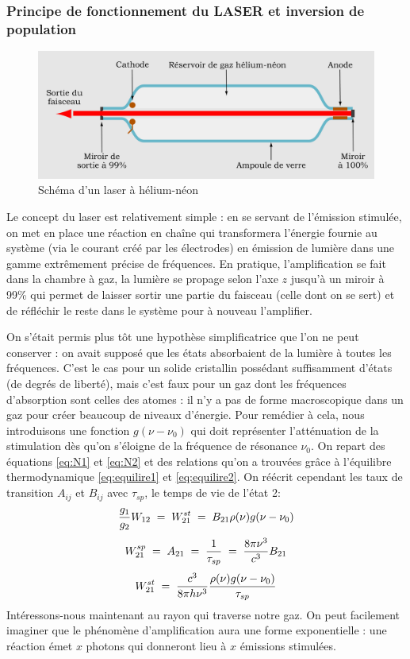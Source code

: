\subsubsection{Principe de fonctionnement du LASER et inversion de population}



\begin{figure}[htp]
    \centering
    \includegraphics[scale=0.7]{Images2/Laser.png}
    \caption{Schéma d'un laser à hélium-néon}
    \label{fig:Laser}
\end{figure}
Le concept du laser est relativement simple : en se servant de l'émission stimulée, on met en place une réaction en chaîne qui transformera l'énergie fournie au système (via le courant créé par les électrodes) en émission de lumière dans une gamme extrêmement précise de fréquences. En pratique, l'amplification se fait dans la chambre à gaz, la lumière se propage selon l'axe $z$ jusqu'à un miroir à 99\% qui permet de laisser sortir une partie du faisceau (celle dont on se sert) et de réfléchir le reste dans le système pour à nouveau l'amplifier.

On s'était permis plus tôt une hypothèse simplificatrice que l'on ne peut conserver : on avait supposé que les états absorbaient de la lumière à toutes les fréquences. C'est le cas pour un solide cristallin possédant suffisamment d'états (de degrés de liberté), mais c'est faux pour un gaz dont les fréquences d'absorption sont celles des atomes : il n'y a pas de forme macroscopique dans un gaz pour créer beaucoup de niveaux d'énergie. Pour remédier à cela, nous introduisons une fonction $g(\nu - \nu_0)$ qui doit représenter l'atténuation de la stimulation dès qu'on s'éloigne de la fréquence de résonance $\nu_0$. On repart des équations \ref{eq:N1} et \ref{eq:N2} et des relations qu'on a trouvées grâce à l'équilibre thermodynamique \ref{eq:equilire1} et \ref{eq:equilire2}. On réécrit cependant les taux de transition $A_{ij}$ et $B_{ij}$ avec $\tau_{sp}$, le temps de vie de l'état 2:
\[
    \dfrac{g_1}{g_2}W_{12} \; = \; W_{21}^{st} \; = \; B_{21} \rho(\nu) g(\nu - \nu_0)
\]
\[
    W_{21}^{sp} \; = \; A_{21} \; = \; \dfrac{1}{\tau_{sp}} \; = \; \dfrac{8\pi \nu^3}{c^3}B_{21}
\]
\[
    W_{21}^{st} \; = \; \dfrac{c^3}{8\pi h \nu^3}\dfrac{\rho(\nu) g(\nu - \nu_0)}{\tau_{sp}}
\]
Intéressons-nous maintenant au rayon qui traverse notre gaz. On peut facilement imaginer que le phénomène d'amplification aura une forme exponentielle : une réaction émet $x$ photons qui donneront lieu à $x$ émissions stimulées.\\

